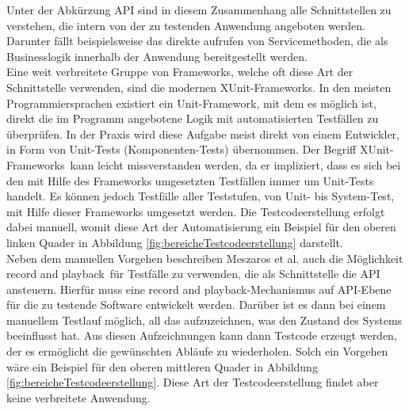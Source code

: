 Unter der Abkürzung API sind in diesem Zusammenhang alle Schnittstellen zu verstehen, die intern von der zu testenden Anwendung angeboten werden. Darunter fällt beispielsweise das direkte aufrufen von Servicemethoden, die als Businesslogik innerhalb der Anwendung bereitgestellt werden.\\
Eine weit verbreitete Gruppe von Frameworks, welche oft diese Art der Schnittstelle verwenden, sind die modernen \grq XUnit-Frameworks\grq. In den meisten Programmiersprachen existiert ein Unit-Framework, mit dem es möglich ist, direkt die im Programm angebotene Logik mit automatisierten Testfällen zu überprüfen. In der Praxis wird diese Aufgabe meist direkt von einem Entwickler, in Form von Unit-Tests (Komponenten-Tests) übernommen. Der Begriff \grq XUnit-Frameworks\grq\ kann leicht missverstanden werden, da er impliziert, dass es sich bei den mit Hilfe des Frameworks umgesetzten Testfällen immer um Unit-Tests handelt. Es können jedoch Testfälle aller Teststufen, von Unit- bis System-Test, mit Hilfe dieser Frameworks umgesetzt werden.
Die Testcodeerstellung erfolgt dabei manuell, womit diese Art der Automatisierung ein Beispiel für den oberen linken Quader in Abbildung \ref{fig:bereicheTestcodeerstellung} darstellt.\\
Neben dem manuellen Vorgehen beschreiben Meszaros et al. \cite{meszaros_agile_2003} auch die Möglichkeit \grq record and playback\grq\ für Testfälle zu verwenden, die als Schnittstelle die API ansteuern.
Hierfür muss eine \grq record and playback\grq-Mechanismus auf API-Ebene für die zu testende Software entwickelt werden. Darüber ist es dann bei einem manuellem Testlauf möglich, all das aufzuzeichnen, was den Zustand des Systems beeinflusst hat. Aus diesen Aufzeichnungen kann dann Testcode erzeugt werden, der es ermöglicht die gewünschten Abläufe zu wiederholen. Solch ein Vorgehen wäre ein Beispiel für den oberen mittleren Quader in Abbildung \ref{fig:bereicheTestcodeerstellung}. Diese Art der Testcodeerstellung findet aber keine verbreitete Anwendung.

